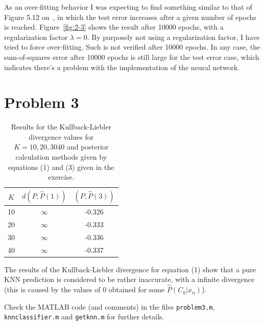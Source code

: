 \documentclass[paper=a4, fontsize=11pt]{scrartcl} %
\numberwithin{equation}{section} %
\numberwithin{figure}{section} %
\numberwithin{table}{section} %
\newcommand{\vertbreak}{\vspace{1.75 mm}}
\begin{document}
As an over-fitting behavior I was expecting to find something similar to 
that of Figure 5.12 on~\cite{Bishop2006}, in which the test error increases after 
a given number of epochs is reached. Figure~\ref{fig:2-3} shows the result 
after 10000 epochs, with a regularization factor $\lambda = 0$. By purposely not 
using a regularization factor, I have tried to force over-fitting. Such is not 
verified after 10000 epochs. In any case, the sum-of-squares error after 10000 
epochs is still large for the test error case, which indicates there's a 
problem with the implementation of the neural network.

\section{Problem 3}

\begin{table}[H]
\begin{center}
    \small
        \begin{tabularx}{0.30\textwidth}{ c | c | c }
            $K$     & $d(P,\hat{P} (1))$  & $(P,\hat{P} (3))$ \\ [0.5ex]
            \hline
            10    & $\infty$ & -0.326 \\ [0.5ex]
            20    & $\infty$ & -0.333 \\ [0.5ex]
            30    & $\infty$ & -0.336 \\ [0.5ex]
            40    & $\infty$ & -0.337 \\ [0.5ex]
        \end{tabularx}
    \caption{Results for the Kullback-Liebler divergence values for 
            $K = {10, 20, 30 40}$ and posterior calculation methods given by 
            equations (1) and (3) given in the exercise.}
    \label{tab:3-1-results}
    \end{center}
\end{table}

The results of the Kullback-Liebler divergence for equation (1) show that a 
pure KNN prediction is considered to be rather inaccurate, with a infinite 
divergence (this is caused by the values of 0 obtained for some 
$\hat{P}(C_k|x_n)$).\vertbreak

Check the MATLAB code (and comments) in the files \verb+problem3.m+, 
\verb+knnclassifier.m+ and \verb+getknn.m+ for further details.



\end{document}
